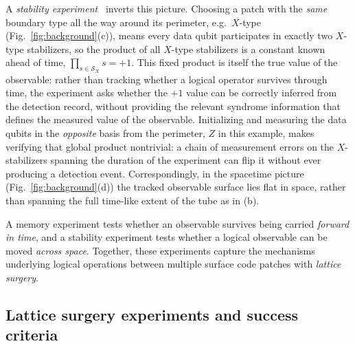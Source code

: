 \documentclass[aps,prxquantum,twocolumn,superscriptaddress,nofootinbib]{revtex4-2}
\begin{document}
A \emph{stability experiment}~\cite{gidney2022stability} inverts this picture. Choosing a patch with the \emph{same} boundary type all the way around its perimeter, e.g.\ $X$-type (Fig.~\ref{fig:background}(c)), means every data qubit participates in exactly two $X$-type stabilizers, so the product of all $X$-type stabilizers is a constant known ahead of time, $\prod_{s \in \mathcal{S}_X} s = +1$. This fixed product is itself the true value of the observable: rather than tracking whether a logical operator survives through time, the experiment asks whether the $+1$ value can be correctly inferred from the detection record, without providing the relevant syndrome information that defines the measured value of the observable. Initializing and measuring the data qubits in the \emph{opposite} basis from the perimeter, $Z$ in this example, makes verifying that global product nontrivial: a chain of measurement errors on the $X$-stabilizers spanning the duration of the experiment can flip it without ever producing a detection event. Correspondingly, in the spacetime picture (Fig.~\ref{fig:background}(d)) the tracked observable surface lies flat in space, rather than spanning the full time-like extent of the tube as in (b). 

A memory experiment tests whether an observable survives being carried \emph{forward in time}, and a stability experiment tests whether a logical observable can be moved \emph{across space}. Together, these experiments capture the mechanisms underlying logical operations between multiple surface code patches with \emph{lattice surgery}.

\subsection{Lattice surgery experiments and success criteria}
\label{sec:merge_targets}
\end{document}
